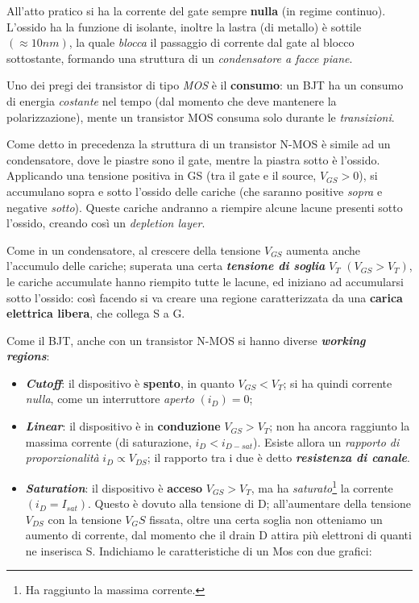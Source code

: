 \documentclass[
]{book}
\providecommand{\tightlist}{%
  \setlength{\itemsep}{0pt}\setlength{\parskip}{0pt}}
\begin{document}
All'atto pratico si ha la corrente del gate sempre \textbf{nulla} (in
regime continuo). L'ossido ha la funzione di isolante, inoltre la lastra
(di metallo) è sottile \((\approx 10 nm)\), la quale \emph{blocca} il
passaggio di corrente dal gate al blocco sottostante, formando una
struttura di un \emph{condensatore a facce piane}.

Uno dei pregi dei transistor di tipo \emph{MOS} è il \textbf{consumo}:
un BJT ha un consumo di energia \emph{costante} nel tempo (dal momento
che deve mantenere la polarizzazione), mente un transistor MOS consuma
solo durante le \emph{transizioni}.

Come detto in precedenza la struttura di un transistor N-MOS è simile ad
un condensatore, dove le piastre sono il gate, mentre la piastra sotto è
l'ossido. Applicando una tensione positiva in GS (tra il gate e il
source, \(V_{GS}>0\)), si accumulano sopra e sotto l'ossido delle
cariche (che saranno positive \emph{sopra} e negative \emph{sotto}).
Queste cariche andranno a riempire alcune lacune presenti sotto
l'ossido, creando così un \emph{depletion layer}.

Come in un condensatore, al crescere della tensione \(V_{GS}\) aumenta
anche l'accumulo delle cariche; superata una certa
\textbf{\emph{tensione di soglia}} \(V_{T}\) \((V_{GS}>V_T)\), le
cariche accumulate hanno riempito tutte le lacune, ed iniziano ad
accumularsi sotto l'ossido: così facendo si va creare una regione
caratterizzata da una \textbf{carica elettrica libera}, che collega S a
G.

Come il BJT, anche con un transistor N-MOS si hanno diverse
\textbf{\emph{working regions}}:

\begin{itemize}
\tightlist
\item
  \textbf{\emph{Cutoff}}: il dispositivo è \textbf{spento}, in quanto
  \(V_{GS}<V_T\); si ha quindi corrente \emph{nulla}, come un
  interruttore \emph{aperto} \((i_D)=0\);
\item
  \textbf{\emph{Linear}}: il dispositivo è in \textbf{conduzione}
  \(V_{GS}>V_T\); non ha ancora raggiunto la massima corrente (di
  saturazione, \(i_D<i_{D-sat}\)). Esiste allora un \emph{rapporto di
  proporzionalità} \(i_D \propto V_{DS}\); il rapporto tra i due è detto
  \textbf{\emph{resistenza di canale}}.
\item
  \textbf{\emph{Saturation}}: il dispositivo è \textbf{acceso}
  \(V_{GS}>V_T\), ma ha \emph{saturato}\footnote{Ha raggiunto la massima
    corrente.} la corrente \((i_D=I_{sat})\). Questo è dovuto alla
  tensione di D; all'aumentare della tensione \(V_{DS}\) con la tensione
  \(V_GS\) fissata, oltre una certa soglia non otteniamo un aumento di
  corrente, dal momento che il drain D attira più elettroni di quanti ne
  inserisca S. Indichiamo le caratteristiche di un Mos con due grafici:
\end{itemize}
\end{document}

